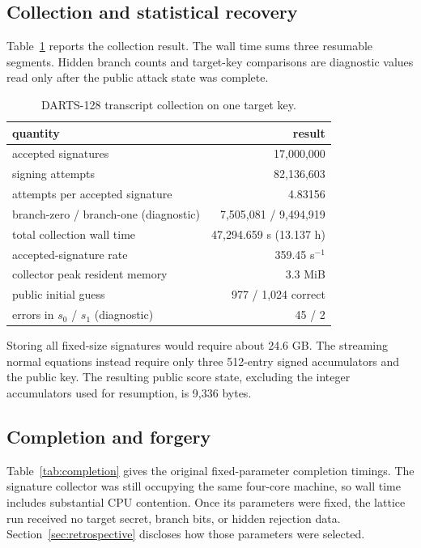 \documentclass[11pt,a4paper]{article}
\begin{document}
\subsection{Collection and statistical recovery}

Table~\ref{tab:collection} reports the collection result.  The wall time sums
three resumable segments.  Hidden branch counts and target-key comparisons
are diagnostic values read only after the public attack state was complete.

\begin{table}[ht]
\centering
\caption{DARTS-128 transcript collection on one target key.}
\label{tab:collection}
\begin{tabular}{lr}
\toprule
quantity & result\\
\midrule
accepted signatures & 17,000,000\\
signing attempts & 82,136,603\\
attempts per accepted signature & 4.83156\\
branch-zero / branch-one (diagnostic) & 7,505,081 / 9,494,919\\
total collection wall time & 47,294.659 s (13.137 h)\\
accepted-signature rate & 359.45 s$^{-1}$\\
collector peak resident memory & 3.3 MiB\\
public initial guess & 977 / 1,024 correct\\
errors in $s_0$ / $s_1$ (diagnostic) & 45 / 2\\
\bottomrule
\end{tabular}
\end{table}

Storing all fixed-size signatures would require about 24.6 GB.  The streaming
normal equations instead require only three 512-entry signed accumulators and
the public key.  The resulting public score state, excluding the integer
accumulators used for resumption, is 9,336 bytes.

\subsection{Completion and forgery}

Table~\ref{tab:completion} gives the original fixed-parameter completion
timings.
The signature collector was still occupying the same four-core machine, so
wall time includes substantial CPU contention.  Once its parameters were
fixed, the lattice run received no target secret, branch bits, or hidden
rejection data.  Section~\ref{sec:retrospective} discloses how those parameters
were selected.
\end{document}
